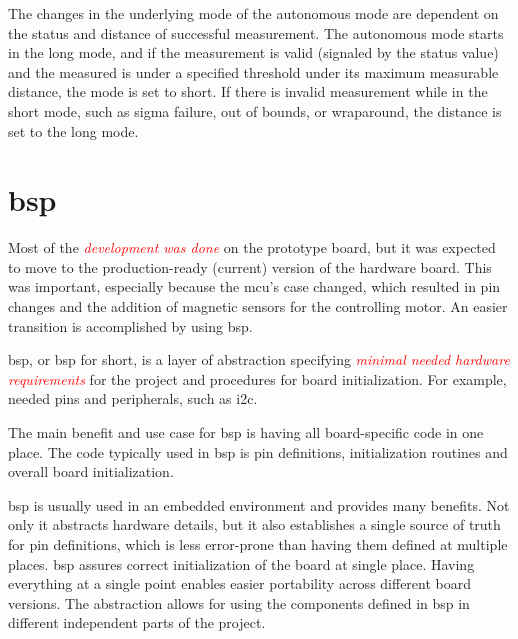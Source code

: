 \documentclass[
  digital,     %
  oneside,     %
  nosansbold,  %
  nocolorbold, %
  nolof,         %
  nolot,         %
]{fithesis4}
\newcommand{\TODO}[1]{\textcolor{red}{\textit{#1}}}
\newcommand{\TODOLIST}[1]{}
\begin{document}
{{{The changes in the underlying mode of the autonomous mode are dependent on the status and distance of successful measurement. The autonomous mode starts in the long mode, and if the measurement is valid (signaled by the status value) and the measured is under a specified threshold under its maximum measurable distance, the mode is set to short. If there is invalid measurement while in the short mode, such as sigma failure, out of bounds, or wraparound, the distance is set to the long mode.


\chapter[ Board Support Package ]{\acrlong{bsp}} \label{ch:bsp}
\TODOLIST{
\begin{itemize}
    \item \acrshort{bsp} = providing i2c functions to \acrshort{lidar} library + easier portability
    \item \acrshort{bsp} = global namespace \lstinline{Gpio::Pin} initialization is **UB**
\end{itemize}
}

Most of the \TODO{development was done} on the prototype board, but it was expected to move to the production-ready (current) version of the hardware board. This was important, especially because the \acrshort{mcu}'s case changed, which resulted in pin changes and the addition of magnetic sensors for the controlling motor. An easier transition is accomplished by using \acrshort{bsp}.

\acrlong{bsp}, or \acrshort{bsp} for short, is a layer of abstraction specifying \TODO{minimal needed hardware requirements} for the project and procedures for board initialization. For example, needed pins and peripherals, such as \acrshort{i2c}. 

The main benefit and use case for \acrshort{bsp} is having all board-specific code in one place. The code typically used in \acrshort{bsp} is pin definitions, initialization routines and overall board initialization.

\acrshort{bsp} is usually used in an embedded environment and provides many benefits. Not only it abstracts hardware details, but it also establishes a single source of truth for pin definitions, which is less error-prone than having them defined at multiple places. \acrshort{bsp} assures correct initialization of the board at single place. Having everything at a single point enables easier portability across different board versions. The abstraction allows for using the components defined in \acrshort{bsp} in different independent parts of the project. 

}}}
\end{document}
